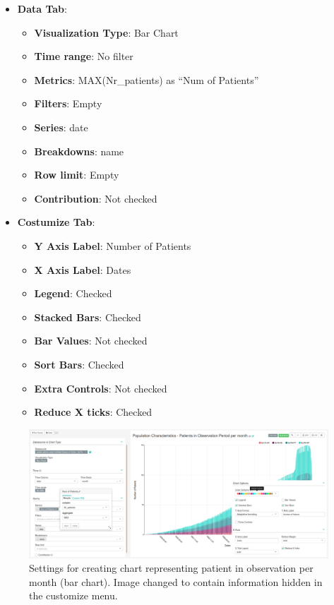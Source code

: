\documentclass[]{book}
\providecommand{\tightlist}{%
  \setlength{\itemsep}{0pt}\setlength{\parskip}{0pt}}
\begin{document}
\begin{itemize}
\tightlist
\item
  \textbf{Data Tab}:

  \begin{itemize}
  \tightlist
  \item
    \textbf{Visualization Type}: Bar Chart
  \item
    \textbf{Time range}: No filter
  \item
    \textbf{Metrics}: MAX(Nr\_patients) as ``Num of Patients''
  \item
    \textbf{Filters}: Empty
  \item
    \textbf{Series}: date
  \item
    \textbf{Breakdowns}: name
  \item
    \textbf{Row limit}: Empty
  \item
    \textbf{Contribution}: Not checked
  \end{itemize}
\item
  \textbf{Costumize Tab}:

  \begin{itemize}
  \tightlist
  \item
    \textbf{Y Axis Label}: Number of Patients
  \item
    \textbf{X Axis Label}: Dates
  \item
    \textbf{Legend}: Checked
  \item
    \textbf{Stacked Bars}: Checked
  \item
    \textbf{Bar Values}: Not checked
  \item
    \textbf{Sort Bars}: Checked
  \item
    \textbf{Extra Controls}: Not checked
  \item
    \textbf{Reduce X ticks}: Checked
  \end{itemize}
\end{itemize}

\begin{figure}
\includegraphics[width=1\linewidth]{images/populationCharacteristicsPatientsInObservationPeriodPerMonth} \caption{Settings for creating chart representing patient in observation per month (bar chart). Image changed to contain information hidden in the customize menu.}\label{fig:populationCharacteristicsPatientsInObservationPeriodPerMonth}
\end{figure}
\end{document}
